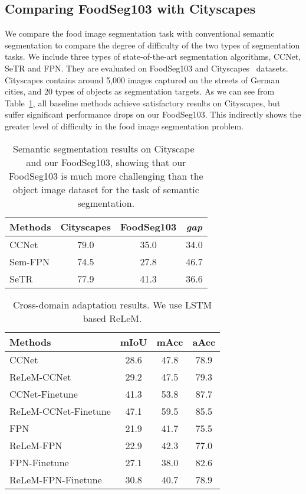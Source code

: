 \subsection{Comparing FoodSeg103 with Cityscapes} 
We compare the food image segmentation task with conventional semantic segmentation to compare the degree of difficulty of the two types of segmentation tasks.
We include three types of state-of-the-art segmentation algorithms, CCNet, SeTR and FPN.  They are evaluated on FoodSeg103 and Cityscapes~\cite{Cordts2016Cityscapes} datasets. Cityscapes contains around 5,000 images captured on the streets of German cities, and 20 types of objects as segmentation targets.
As we can see from Table~\ref{tab:cityscape}, all baseline methods achieve satisfactory results on Cityscapes, but suffer significant performance drops on our FoodSeg103. This indirectly shows the greater level of difficulty in the food image segmentation problem.

\begin{table}[thp]
		\centering
		\resizebox{0.43\textwidth}{!}
		{
		\begin{tabular}{|l|c|c|c|}
			\hline 
			Methods\;\; & Cityscapes & FoodSeg103 & \emph{gap}\\
			\hline
			CCNet &79.0 & 35.0 & 34.0 \\
			Sem-FPN &74.5 &27.8 & 46.7 \\
			SeTR &77.9 &41.3 &36.6 \\
			\hline
			\hline
		\end{tabular}}
		\caption{
		Semantic segmentation results on Cityscape~\cite{Cordts2016Cityscapes} and our FoodSeg103, showing that our FoodSeg103 is much more challenging than the object image dataset for the task of semantic segmentation.
		}
		\vspace{-5mm}
		\label{tab:cityscape}
	\end{table} 
\begin{table}[thp]
		\centering
		\resizebox{0.45\textwidth}{!}
		{
		\begin{tabular}{|l|c|c|c|}
			\hline 
			Methods\;\;  &mIoU & mAcc & aAcc \\
			\hline
			CCNet &  28.6 & 47.8 & 78.9\\
			ReLeM-CCNet & 29.2 & 47.5 &79.3\\
			CCNet-Finetune &41.3 & 53.8 & 87.7\\
			ReLeM-CCNet-Finetune &47.1 &59.5&85.5\\
			\hline
			FPN & 21.9 & 41.7 & 75.5\\
			ReLeM-FPN & 22.9 &42.3 & 77.0\\
			FPN-Finetune & 27.1&38.0&82.6\\
			ReLeM-FPN-Finetune &30.8 &40.7 & 78.9\\
			\hline
			\hline
		\end{tabular}}
		\caption{Cross-domain adaptation results. We use LSTM based ReLeM.}
		\vspace{-5mm}
		\label{tab:adapt}
	\end{table} 
\vspace{-3mm}
